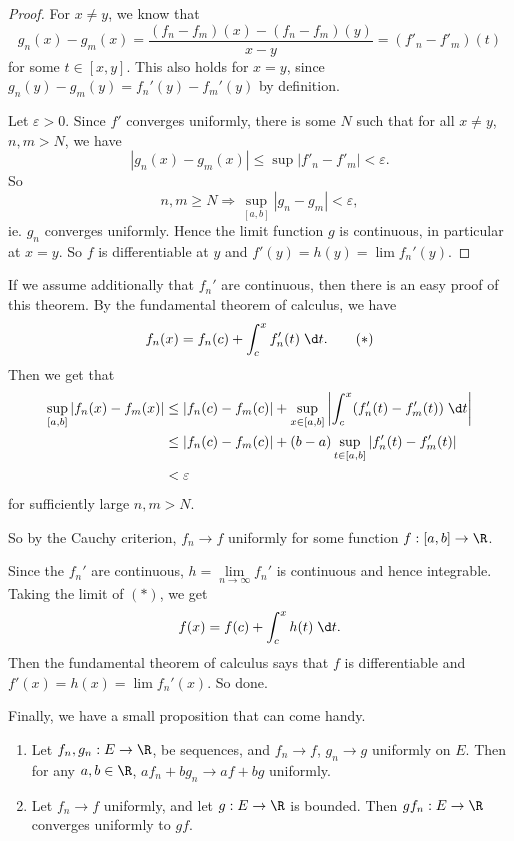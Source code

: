 \documentclass[a4paper]{article}
\begin{document}
\begin{proof}
  For $x \not = y$, we know that
  \[
    g_n(x) - g_m(x) = \frac{(f_n - f_m)(x) - (f_n - f_m)(y)}{x - y} = (f'_n - f'_m)(t)
  \]
  for some $t \in [x, y]$. This also holds for $x = y$, since $g_n(y) - g_m(y) = f_n'(y) - f_m'(y)$ by definition.

  Let $\varepsilon > 0$. Since $f'$ converges uniformly, there is some $N$ such that for all $x\not= y$, $n, m > N$, we have
  \[
    |g_n(x) - g_m(x)| \leq \sup |f'_n - f'_m| < \varepsilon.
  \]
   So
  \[
    n, m\geq N \Rightarrow \sup_{[a, b]}|g_n - g_m| < \varepsilon,
  \]
  ie. $g_n$ converges uniformly. Hence the limit function $g$ is continuous, in particular at $x = y$. So $f$ is differentiable at $y$ and $f'(y) = h(y) = \lim f_n'(y)$.
\end{proof}

If we assume additionally that $f_n'$ are continuous, then there is an easy proof of this theorem. By the fundamental theorem of calculus, we have
\[
  f_n(x) = f_n(c) + \int_c^x f_n'(t)\;\d t.\tag{$*$}
\]
Then we get that
\begin{align*}
  \sup_{[a, b]}|f_n(x) - f_m(x)| &\leq |f_n(c) - f_m(c)| + \sup_{x\in [a, b]}\left|\int_c^x (f_n'(t) - f_m'(t))\;\d t\right|\\
  &\leq |f_n(c) - f_m(c)| + (b - a)\sup_{t\in [a, b]}|f_n'(t) - f_m'(t)|\\
  &< \varepsilon
\end{align*}
for sufficiently large $n, m> N$.

So by the Cauchy criterion, $f_n \to f$ uniformly for some function $f: [a, b] \to \R$.

Since the $f_n'$ are continuous, $h = \lim\limits_{n\to \infty} f_n'$ is continuous and hence integrable. Taking the limit of $(*)$, we get
\[
  f(x) = f(c) + \int_c^x h(t)\;\d t.
\]
Then the fundamental theorem of calculus says that $f$ is differentiable and $f'(x) = h(x) = \lim f_n'(x)$. So done.

Finally, we have a small proposition that can come handy.
\begin{prop}\leavevmode
  \begin{enumerate}
    \item Let $f_n, g_n: E\to \R$, be sequences, and $f_n \to f$, $g_n \to g$ uniformly on $E$. Then for any $a, b\in \R$, $af_n + bg_n \to af + bg$ uniformly.
    \item Let $f_n \to f$ uniformly, and let $g: E\to \R$ is bounded. Then $gf_n: E\to \R$ converges uniformly to $gf$.
  \end{enumerate}
\end{prop}
\end{document}
